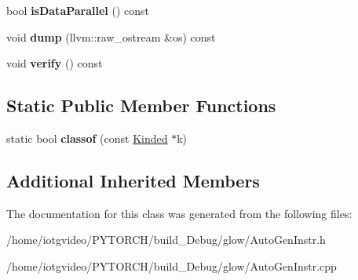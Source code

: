 \begin{DoxyCompactItemize}
\mbox{\label{classglow_1_1_convolution_inst_ab4abf72231be2665b8097bd79caf69e6}} 
bool {\bfseries is\+Data\+Parallel} () const
\item 
\mbox{\label{classglow_1_1_convolution_inst_a11fbd691e48add45fb767195d1ef0feb}} 
void {\bfseries dump} (llvm\+::raw\+\_\+ostream \&os) const
\item 
\mbox{\label{classglow_1_1_convolution_inst_a6a7c1bd59a53924cb840c799e9c185ad}} 
void {\bfseries verify} () const
\end{DoxyCompactItemize}
\subsection*{Static Public Member Functions}
\begin{DoxyCompactItemize}
\item 
\mbox{\label{classglow_1_1_convolution_inst_acf9acf86c5725d280634ffd0d2700718}} 
static bool {\bfseries classof} (const \hyperlink{classglow_1_1_kinded}{Kinded} $\ast$k)
\end{DoxyCompactItemize}
\subsection*{Additional Inherited Members}


The documentation for this class was generated from the following files\+:\begin{DoxyCompactItemize}
\item 
/home/iotgvideo/\+P\+Y\+T\+O\+R\+C\+H/build\+\_\+\+Debug/glow/Auto\+Gen\+Instr.\+h\item 
/home/iotgvideo/\+P\+Y\+T\+O\+R\+C\+H/build\+\_\+\+Debug/glow/Auto\+Gen\+Instr.\+cpp\end{DoxyCompactItemize}
